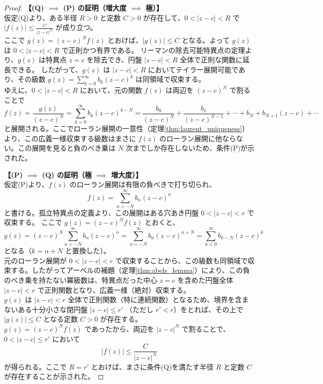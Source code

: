 \documentclass[paper=a4, fontsize=11pt]{jlreq} %
\theoremstyle{break}
\theoremstyle{qa}
\theoremstyle{remark} %
\begin{document}
\begin{proof}
    \textbf{【(Q) $\implies$ (P) の証明（増大度 $\implies$ 極）】}\\
    仮定(Q)より、ある半径 $R > 0$ と定数 $C > 0$ が存在して、$0 < |z-c| < R$ で $|f(z)| \le \frac{C}{|z-c|^N}$ が成り立つ。\\
    ここで $g(z)=(z-c)^{N}f(z)$ とおけば、$|g(z)|\le C$ となる。よって $g(z)$ は $0<|z-c|<R$ で正則かつ有界である。
    リーマンの除去可能特異点の定理より、$g(z)$ は特異点 $z=c$ を除去でき、円盤 $|z-c|<R$ 全体で正則な関数に延長できる。
    したがって、$g(z)$ は $|z-c|<R$ においてテイラー展開可能であり、その級数 $g(z) = \sum_{k=0}^{\infty} b_k (z-c)^k$ は同領域で収束する。\\
    ゆえに、$0 < |z-c| < R$ において、元の関数 $f(z)$ は両辺を $(z-c)^N$ で割ることで
    \[
    f(z) = \frac{g(z)}{(z-c)^N} = \sum_{k=0}^{\infty} b_k (z-c)^{k-N} = \frac{b_0}{(z-c)^N} + \frac{b_1}{(z-c)^{N-1}} + \cdots + b_N + b_{N+1}(z-c) + \cdots
    \]
    と展開される。ここでローラン展開の一意性（定理\ref{thm:laurent_uniqueness}）より、この広義一様収束する級数はまさに $f(z)$ のローラン展開に他ならない。この展開を見ると負のべき乗は $N$ 次までしか存在しないため、条件(P)が示された。

    \vspace{1em}

    \textbf{【(P) $\implies$ (Q) の証明（極 $\implies$ 増大度）】}\\
    仮定(P)より、$f(z)$ のローラン展開は有限の負べきで打ち切られ、
    \[
    f(z) = \sum_{n=-N}^{\infty} b_n (z-c)^n
    \]
    と書ける。孤立特異点の定義より、この展開はある穴あき円盤 $0 < |z-c| < r$ で収束する。
    ここで $g(z) = (z-c)^N f(z)$ とおくと、
    \[
    g(z) = (z-c)^N \sum_{n=-N}^{\infty} b_n (z-c)^n = \sum_{n=-N}^{\infty} b_n (z-c)^{n+N} = \sum_{k=0}^{\infty} b_{k-N} (z-c)^k
    \]
    となる（$k = n+N$ と置換した）。\\
    元のローラン展開が $0 < |z-c| < r$ で収束することから、この級数も同領域で収束する。したがってアーベルの補題（定理\ref{thm:abels_lemma}）により、この負のべき乗を持たない冪級数は、特異点だった中心 $z=c$ を含めた円盤全体 $|z-c| < r$ で正則関数となり、広義一様（絶対）収束する。\\
    $g(z)$ は $|z-c| < r$ 全体で正則関数（特に連続関数）となるため、境界を含まないある十分小さな閉円盤 $|z-c| \le r'$ （ただし $r' < r$）をとれば、その上で $|g(z)| \le C$ となる定数 $C > 0$ が存在する。\\
    $g(z) = (z-c)^N f(z)$ であったから、両辺を $|z-c|^N$ で割ることで、$0 < |z-c| \le r'$ において
    \[
    |f(z)| \le \frac{C}{|z-c|^N}
    \]
    が得られる。ここで $R = r'$ とおけば、まさに条件(Q)を満たす半径 $R$ と定数 $C$ が存在することが示された。
\end{proof}
\end{document}
